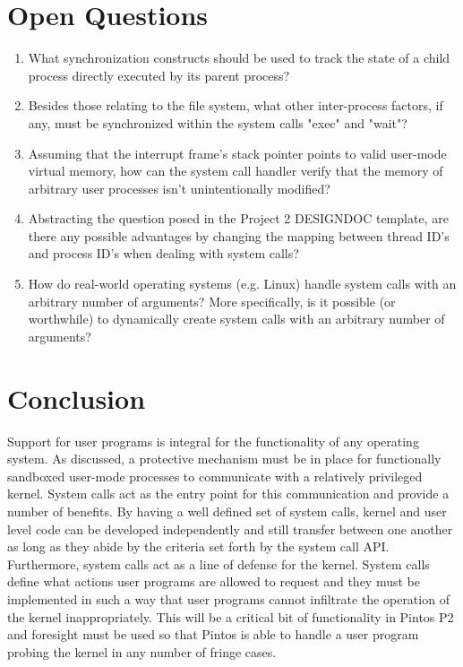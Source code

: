 \documentclass[11pt, letterpaper]{article}
\begin{document}
\section*{Open Questions}

\begin{enumerate}
\item What synchronization constructs should be used to track the state of a child process directly executed by its parent process? 
\item Besides those relating to the file system, what other inter-process factors, if any, must be synchronized within the system calls "exec" and "wait"?
\item Assuming that the interrupt frame's stack pointer points to valid user-mode virtual memory, how can the system call handler verify that the memory of arbitrary user processes isn't unintentionally modified?
\item Abstracting the question posed in the Project 2 DESIGNDOC template, are there any possible advantages by changing the mapping between thread ID's and process ID's when dealing with system calls?
\item How do real-world operating systems (e.g. Linux) handle system calls with an arbitrary number of arguments? More specifically, is it possible (or worthwhile) to dynamically create system calls with an arbitrary number of arguments?
\end{enumerate} 



\section*{Conclusion}

Support for user programs is integral for the functionality of any operating system. As discussed, a protective mechanism must be in place for functionally sandboxed user-mode processes to communicate with a relatively privileged kernel. System calls act as the 
entry point for this communication and provide a number of benefits. By having a well defined set of system calls, kernel and user 
level code can be developed independently and still transfer between one another as long as they abide by the criteria set forth by 
the system call API. Furthermore, system calls act as a line of defense for the kernel. System calls define what actions user 
programs are allowed to request and they must be implemented in such a way that user programs cannot infiltrate the operation of the
kernel inappropriately. This will be a critical bit of functionality in Pintos P2 and foresight must be used so that Pintos is able
to handle a user program probing the kernel in any number of fringe cases.
\end{document}

